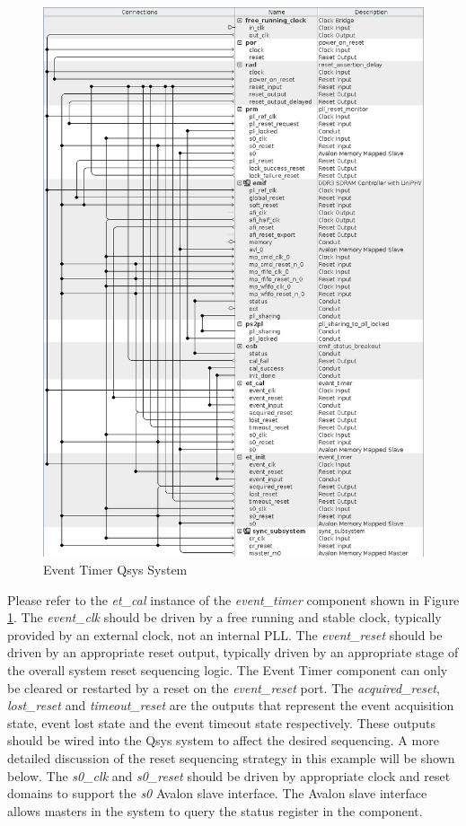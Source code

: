 \documentclass{article}
\begin{document}
\begin{flushleft}
\begin{figure}[H]
\centering
\includegraphics[scale=0.675]{emif_qsys}
\caption{Event Timer Qsys System}
\label{fig:emif_qsys}
\end{figure}

Please refer to the \emph{et\_cal} instance of the \emph{event\_timer} component shown in Figure \ref{fig:emif_qsys}.  The \emph{event\_clk} should be driven by a free running and stable clock, typically provided by an external clock, not an internal PLL.  The \emph{event\_reset} should be driven by an appropriate reset output, typically driven by an appropriate stage of the overall system reset sequencing logic.  The Event Timer component can only be cleared or restarted by a reset on the \emph{event\_reset} port. The \emph{acquired\_reset}, \emph{lost\_reset} and \emph{timeout\_reset} are the outputs that represent the event acquisition state, event lost state and the event timeout state respectively.  These outputs should be wired into the Qsys system to affect the desired sequencing.  A more detailed discussion of the reset sequencing strategy in this example will be shown below.  The \emph{s0\_clk} and \emph{s0\_reset} should be driven by appropriate clock and reset domains to support the \emph{s0} Avalon slave interface.  The Avalon slave interface allows masters in the system to query the status register in the component.


\end{flushleft}
\end{document}
